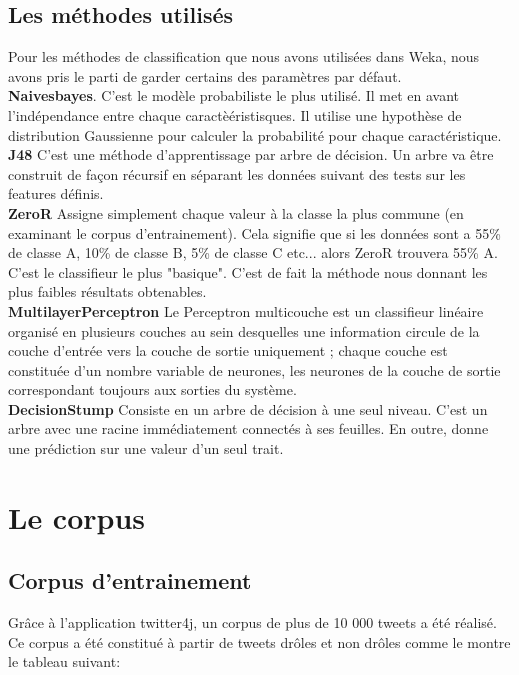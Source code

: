 \documentclass[10pt,a4paper,twoside]{article}
\begin{document}
\subsection{Les méthodes utilisés}
\label{methode}
Pour les méthodes de classification que nous avons utilisées dans Weka, nous avons pris le parti de garder certains des paramètres par défaut. \\
\textbf{Naivesbayes}. C'est le modèle probabiliste le plus utilisé. Il met en avant l'indépendance entre chaque caractèéristisques. Il utilise une hypothèse de distribution Gaussienne pour calculer la probabilité pour chaque caractéristique.\\
\textbf{J48} C'est une méthode d'apprentissage par arbre de décision. Un arbre va être construit de façon récursif en séparant les données suivant des tests sur les features définis.  \\
\textbf{ZeroR} Assigne simplement chaque valeur à la classe la plus commune (en examinant le corpus d'entrainement). Cela signifie que si les données sont a 55\% de classe A, 10\% de classe B, 5\% de classe C etc... alors ZeroR trouvera 55\% A. C'est le classifieur le plus "basique". C'est de fait la méthode nous donnant les plus faibles résultats obtenables.\\
\textbf{MultilayerPerceptron} Le Perceptron multicouche est un classifieur linéaire organisé en plusieurs couches au sein desquelles une information circule de la couche d'entrée vers la couche de sortie uniquement ; chaque couche est constituée d'un nombre variable de neurones, les neurones de la couche de sortie correspondant toujours aux sorties du système.\\
\textbf{DecisionStump} Consiste en un arbre de décision à une seul niveau. C'est un arbre avec une racine immédiatement connectés à ses feuilles. En outre, donne une prédiction sur une valeur d'un seul trait.



\section{Le corpus}
\label{corpus}
\subsection{Corpus d'entrainement}
Grâce à l'application twitter4j, un corpus de plus de 10 000 tweets a été réalisé. Ce corpus a été constitué à partir de tweets drôles et non drôles comme le montre le tableau suivant: 
\end{document}
